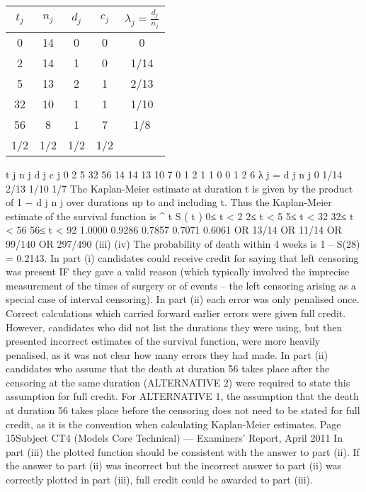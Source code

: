 \documentclass[a4paper,12pt]{article}
\begin{document}
\begin{center}
\begin{tabular}{|c|c|c|c|c|}
$t_j$	&	$n_j$	&	$d_j$	&	$c_j$	&	$\lambda_{j} = \frac{d_j}{n_j}$	\\ \hline
0	&	14	&	0	&	0	&	0	\\ \hline
2	&	14	&	1	&	0	&	1/14	\\ \hline
5	&	13	&	2	&	1	&	2/13	\\ \hline
32	&	10	&	1	&	1	&	1/10	\\ \hline
56	&	8	&	1	&	7	&	1/8	\\ \hline
1/2	&	1/2	&	1/2	&	1/2	&		\\ \hline
\end{tabular}
\end{center}
t j n j d j c j
0
2
5
32
56 14
14
13
10
7 0
1
2
1
1 0
0
1
2
6
λ j =
d j
n j
0
1/14
2/13
1/10
1/7
The Kaplan-Meier estimate at duration t is given by the product of 1 −
d j
n j
over
durations up to and including t. Thus the Kaplan-Meier estimate of the survival
function is
^
t S ( t )
0≤ t < 2
2≤ t < 5
5≤ t < 32
32≤ t < 56
56≤ t < 92 1.0000
0.9286
0.7857
0.7071
0.6061
OR 13/14
OR 11/14
OR 99/140
OR 297/490
(iii)
(iv)
The probability of death within 4 weeks is 1 – S(28) = 0.2143.
In part (i) candidates could receive credit for saying that left censoring was present IF they gave a valid reason (which typically involved the imprecise measurement of the times of
surgery or of events – the left censoring arising as a special case of interval censoring).
In part (ii) each error was only penalised once. Correct calculations which carried forward earlier errors were given full credit. However, candidates who did not list the durations they
were using, but then presented incorrect estimates of the survival function, were more heavily
penalised, as it was not clear how many errors they had made.
In part (ii) candidates who assume that the death at duration 56 takes place after the censoring at the same duration (ALTERNATIVE 2) were required to state this assumption for
full credit. For ALTERNATIVE 1, the assumption that the death at duration 56 takes place before the censoring does not need to be stated for full credit, as it is the convention when
calculating Kaplan-Meier estimates.
Page 15Subject CT4 (Models Core Technical) — Examiners’ Report, April 2011
In part (iii) the plotted function should be consistent with the answer to part (ii). If the
answer to part (ii) was incorrect but the incorrect answer to part (ii) was correctly plotted in
part (iii), full credit could be awarded to part (iii).
\end{document}
